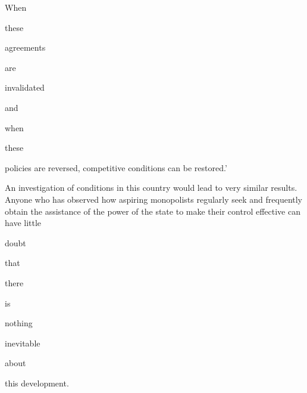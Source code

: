 \documentclass[11pt,openany]{book}
\begin{document}
When

these

agreements

are

invalidated

and

when

these

policies are reversed, competitive conditions can be restored.'

An investigation of conditions in this country would lead to very similar results. Anyone who has observed how aspiring monopolists regularly seek and frequently obtain the assistance of the power of the state to make their control effective can have little

doubt

that

there

is

nothing

inevitable

about

this development.

\begin{center}\textasteriskcentered\hspace{0.9em}\textasteriskcentered\hspace{0.9em}\textasteriskcentered\end{center}

\begin{center}\textasteriskcentered\hspace{0.9em}\textasteriskcentered\hspace{0.9em}\textasteriskcentered\end{center}

\begin{center}\textasteriskcentered\hspace{0.9em}\textasteriskcentered\hspace{0.9em}\textasteriskcentered\end{center}

\begin{center}\textasteriskcentered\hspace{0.9em}\textasteriskcentered\hspace{0.9em}\textasteriskcentered\end{center}

\begin{center}\textasteriskcentered\hspace{0.9em}\textasteriskcentered\hspace{0.9em}\textasteriskcentered\end{center}
\end{document}
